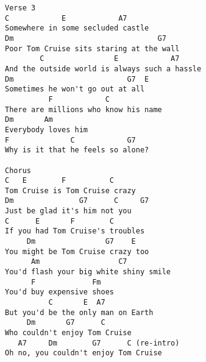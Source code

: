 \documentclass[leqno]{memoir}
\begin{document}
\begin{verbatim}
Verse 3
C            E            A7
Somewhere in some secluded castle
Dm                                 G7
Poor Tom Cruise sits staring at the wall
        C                E            A7
And the outside world is always such a hassle
Dm                          G7  E
Sometimes he won't go out at all
          F            C
There are millions who know his name
Dm       Am
Everybody loves him
F              C            G7
Why is it that he feels so alone?

Chorus
C   E        F          C
Tom Cruise is Tom Cruise crazy
Dm               G7      C     G7
Just be glad it's him not you
C      E       F        C
If you had Tom Cruise's troubles
     Dm                G7    E
You might be Tom Cruise crazy too
      Am                  C7
You'd flash your big white shiny smile
      F             Fm
You'd buy expensive shoes
          C       E  A7
But you'd be the only man on Earth
     Dm       G7      C
Who couldn't enjoy Tom Cruise
   A7     Dm        G7      C (re-intro)
Oh no, you couldn't enjoy Tom Cruise
\end{verbatim}
\newpage
\end{document}
